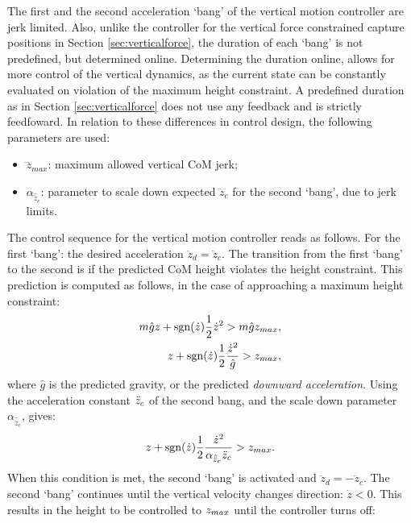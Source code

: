 The first and the second acceleration `bang' of the vertical motion controller are jerk limited. Also, unlike the controller for the vertical force constrained capture positions in Section \ref{sec:verticalforce}, the duration of each `bang' is not predefined, but determined online. Determining the duration online, allows for more control of the vertical dynamics, as the current state can be constantly evaluated on violation of the maximum height constraint. A predefined duration as in Section \ref{sec:verticalforce} does not use any feedback and is strictly feedfoward. In relation to these differences in control design, the following parameters are used:
\begin{itemize}
	\item $\dddot{z}_{max}$: maximum allowed vertical CoM jerk;
	\item $\alpha_{\hat{\ddot{z}}_{c}}$: parameter to scale down expected $\ddot{z}_c$ for the second `bang', due to jerk limits.
\end{itemize}
The control sequence for the vertical motion controller reads as follows. For the first `bang': the desired acceleration $\ddot{z}_d=\ddot{z}_c$. The transition from the first `bang' to the second is if the predicted \ac{CoM} height violates the height constraint. This prediction is computed as follows, in the case of approaching a maximum height constraint:
\begin{align}
	m\hat{g}z + \operatorname{sgn}(\dot{z})\frac{1}{2}\dot{z}^2>m\hat{g}z_{max},\\
	z + \operatorname{sgn}(\dot{z})\frac{1}{2}\frac{\dot{z}^2}{\hat{g}}>z_{max},
\end{align}
where $\hat{g}$ is the predicted gravity, or the predicted \textit{downward acceleration}. Using the acceleration constant $\ddot{z}_{c}$ of the second bang, and the scale down parameter $\alpha_{\hat{\ddot{z}}_{c}}$, gives:
\begin{equation}
	z+\operatorname{sgn}(\dot{z})\frac{1}{2}\frac{\dot{z}^2}{\alpha_{\hat{\ddot{z}}_{c}}\ddot{z}_{c}} >z_{max}.
\end{equation}
When this condition is met, the second `bang' is activated and $\ddot{z}_d=-\ddot{z}_c$. The second `bang' continues until the vertical velocity changes direction: $\dot{z}<0$. This results in the height to be controlled to $z_{max}$ until the controller turns off:
